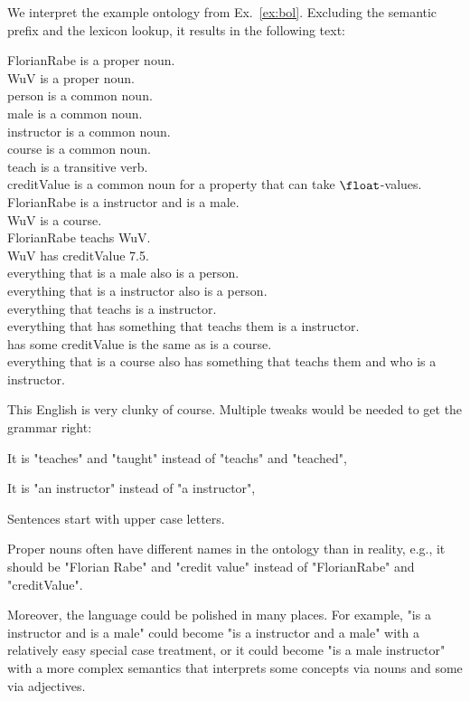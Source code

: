 \begin{example}
We interpret the example ontology from Ex.~\ref{ex:bol}.
Excluding the semantic prefix and the lexicon lookup, it results in the following text:
\medskip

FlorianRabe is a proper noun.\\
WuV is a proper noun.\\
person is a common noun.\\
male is a common noun.\\
instructor is a common noun.\\
course is a common noun.\\
teach is a transitive verb.\\
creditValue is a common noun for a property that can take $\float$-values.\\
FlorianRabe is a instructor and is a male.\\
WuV is a course.\\
FlorianRabe teachs WuV.\\
WuV has creditValue 7.5.\\
everything that is a male also is a person.\\
everything that is a instructor also is a person.\\
everything that teachs is a instructor.\\
everything that has something that teachs them is a instructor.\\
has some creditValue is the same as is a course.\\
everything that is a course also has something that teachs them and who is a instructor.
\medskip

This English is very clunky of course.
Multiple tweaks would be needed to get the grammar right:
\begin{compactitem}
 \item It is "teaches" and "taught" instead of "teachs" and "teached",
 \item It is "an instructor" instead of "a instructor",
 \item Sentences start with upper case letters.
 \item Proper nouns often have different names in the ontology than in reality, e.g., it should be "Florian Rabe" and "credit value" instead of "FlorianRabe" and "creditValue".
\end{compactitem}
Moreover, the language could be polished in many places.
For example, "is a instructor and is a male" could become "is a instructor and a male" with a relatively easy special case treatment, or it could become "is a male instructor" with a more complex semantics that interprets some concepts via nouns and some via adjectives.
\end{example}

